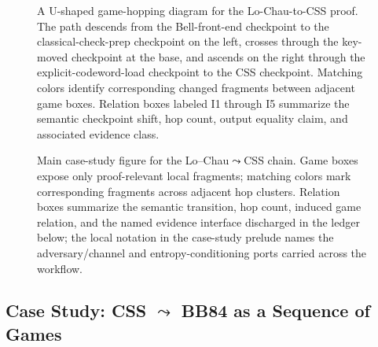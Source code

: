 \documentclass{report}
\theoremstyle{defn_style}
\begin{document}
\begin{figure}[!t]
\begin{tcolorbox}[
  width=\linewidth,
  colback=lcPanel!18,
  colframe=black!45,
  boxrule=0.6pt,
  arc=6pt,
  left=4pt,
  right=4pt,
  top=4pt,
  bottom=5pt,
  boxsep=1pt
]
{%
}
\caption{
Main case-study figure for the Lo--Chau$\leadsto$CSS chain.
Game boxes expose only proof-relevant local fragments; matching colors
mark corresponding fragments across adjacent hop clusters.
Relation boxes summarize the semantic transition, hop count, induced
game relation, and the named evidence interface discharged in the
ledger below; the local notation in the case-study prelude names the
adversary/channel and entropy-conditioning ports carried across the
workflow.
}
{A U-shaped game-hopping diagram for the Lo-Chau-to-CSS proof. The path descends from the Bell-front-end checkpoint to the classical-check-prep checkpoint on the left, crosses through the key-moved checkpoint at the base, and ascends on the right through the explicit-codeword-load checkpoint to the CSS checkpoint. Matching colors identify corresponding changed fragments between adjacent game boxes. Relation boxes labeled I1 through I5 summarize the semantic checkpoint shift, hop count, output equality claim, and associated evidence class.}
\label{fig:lc-css-main}
\end{tcolorbox}
\endgroup
\end{figure}
\clearpage

\subsection{\texorpdfstring{Case Study: CSS $\leadsto$ BB84 as a Sequence of Games}{Case Study: CSS to BB84 as a Sequence of Games}}
\end{document}

